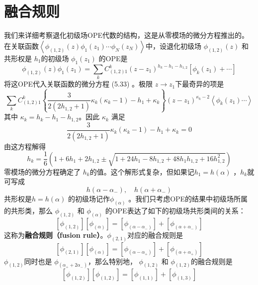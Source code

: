 \section{融合规则}

我们来详细考察退化初级场OPE代数的结构，这是从零模场的微分方程推出的。在关联函数$ \left\langle\phi_{(1,2)}(z) \phi_{1}\left(z_{1}\right) \cdots \phi_{N}\left(z_{N}\right)\right\rangle $中，设退化初级场 $\phi_{(1,2)}(z)$ 和共形权是 $h_1 $的初级场 $\phi_1(z_1)$ 的OPE是
\begin{equation}
	\phi_{(1,2)}(z) \phi_{1}\left(z_{1}\right)=\sum_{k} C_{(1,2) 1}^{k}\left(z-z_{1}\right)^{h_{k}-h_{1}-h_{1,2}}\left[\phi_{k}\left(z_{1}\right)+\cdots\right]
\end{equation}
将这OPE代入关联函数的微分方程 (5.33) 。极限 $z\to z_1 $下最奇异的项是
\begin{equation}
\sum_{k} C_{(1,2) 1}^{k}\left\{\frac{3}{2\left(2 h_{1,2}+1\right)} \kappa_{k}\left(\kappa_{k}-1\right)-h_{1}+\kappa_{k}\right\}\left(z-z_{1}\right)^{\kappa_{k}-2}\left\langle\phi_{k}\left(z_{1}\right) \cdots\right\rangle	
\end{equation}
其中 $\kappa_{k}=h_{k}-h_{1}-h_{1,2} $。因此 $\kappa_k$ 满足
\begin{equation}
	\frac{3}{2\left(2 h_{1,2}+1\right)} \kappa_{k}\left(\kappa_{k}-1\right)-h_{1}+\kappa_{k}=0
\end{equation}
由这方程解得
\begin{equation}
h_{k}=\frac{1}{6}\left(1+6 h_{1}+2 h_{1,2} \pm \sqrt{1+24 h_{1}-8 h_{1,2}+48 h_{1} h_{1,2}+16 h_{1,2}^{2}}\right)	
\end{equation}
零模场的微分方程确定了 $h_k $的值。这个解形式复杂，但如果记$ h_1=h(\alpha)$ ，$ h_k $就可写成
\begin{equation}
	h\left(\alpha-\alpha_{-}\right), \quad h\left(\alpha+\alpha_{-}\right)
\end{equation}
共形权是$ h=h(\alpha)$ 的初级场记作$ \phi_{(\alpha)}$ 。我们只考虑OPE的结果中初级场所属的共形类，那么 $\phi_{(1,2)}$ 和 $\phi_{(\alpha)}$ 的OPE表达了如下的初级场共形类间的关系：
\begin{equation}
	\left[\phi_{(1,2)}\right]\left[\phi_{(\alpha)}\right]=\left[\phi_{\left(\alpha-\alpha_{-}\right)}\right]+\left[\phi_{\left(\alpha+\alpha_{-}\right)}\right]
\end{equation}
这称为\textbf{融合规则（fusion rule）}。$ \phi_{(2,1)} $对应的融合规则是
\begin{equation}
	\left[\phi_{(2,1)}\right]\left[\phi_{(\alpha)}\right]=\left[\phi_{\left(\alpha-\alpha_{+}\right)}\right]+\left[\phi_{\left(\alpha+\alpha_{+}\right)}\right]
\end{equation}
$\phi_{(1,2)} $同时也是 $\phi_{\left(\alpha_{+}+2 \alpha_{-}\right)} $，那么特别地， $\phi_{(1,2)}$ 和 $\phi_{(1,2)} $的融合规则是
\begin{equation}
	\left[\phi_{(1,2)}\right]\left[\phi_{(1,2)}\right]=\left[\phi_{(1,1)}\right]+\left[\phi_{(1,3)}\right]
\end{equation}

